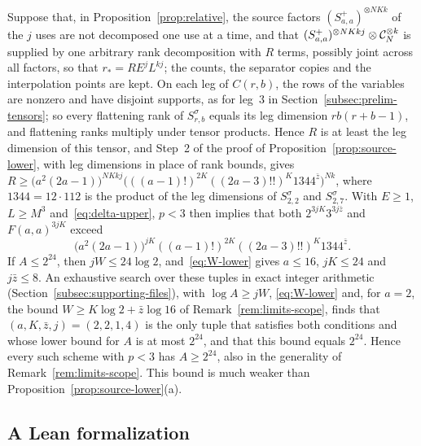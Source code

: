 \begin{remark}
\label{rem:joint-decompositions}
Suppose that, in Proposition~\ref{prop:relative}, the source factors
\((S^+_{a,a})^{\otimes NKk}\) of the \(j\) uses are not decomposed one
use at a time, and that
\((S^+_{a,a})^{\otimes NKkj}\otimes\mathcal C_N^{\otimes k}\) is supplied by
one arbitrary rank decomposition with \(R\) terms, possibly joint across
all factors, so that \(r_*=RE^jL^{kj}\); the counts, the separator
copies and the interpolation points are kept. On each leg of \(C(r,b)\), the rows of
the variables are nonzero and have disjoint supports, as for leg~\(3\)
in Section~\ref{subsec:prelim-tensors}; so every flattening rank of
\(S^\sigma_{r,b}\) equals its leg dimension \(rb(r+b-1)\), and
flattening ranks multiply under tensor products. Hence \(R\) is at least
the leg dimension of this tensor, and Step~2 of the proof of
Proposition~\ref{prop:source-lower}, with leg dimensions in place of
rank bounds, gives
\(R\ge\bigl(a^2(2a-1)\bigr)^{NKkj}
\bigl(((a-1)!)^{2K}((2a-3)!!)^K1344^{\bar z}\bigr)^{Nk}\), where
\(1344=12\cdot112\) is the product of the leg dimensions of
\(S^\sigma_{2,2}\) and \(S^\sigma_{2,7}\). With \(E\ge1\), \(L\ge M^3\)
and~\eqref{eq:delta-upper}, \(p<3\) then implies that both
\(2^{3jK}3^{3j\bar z}\) and \(F(a,a)^{3jK}\) exceed
\[
 \bigl(a^2(2a-1)\bigr)^{jK}((a-1)!)^{2K}((2a-3)!!)^K1344^{\bar z}.
\]
If \(A\le2^{24}\), then \(jW\le24\log2\), and~\eqref{eq:W-lower} gives
\(a\le16\), \(jK\le24\) and \(j\bar z\le8\). An exhaustive search over
these tuples in exact integer arithmetic
(Section~\ref{subsec:supporting-files}), with \(\log A\ge jW\),
\eqref{eq:W-lower} and, for \(a=2\), the bound
\(W\ge K\log2+\bar z\log16\) of Remark~\ref{rem:limits-scope}, finds
that \((a,K,\bar z,j)=(2,2,1,4)\) is the only tuple that satisfies both
conditions and whose lower bound for \(A\) is at most \(2^{24}\), and
that this bound equals \(2^{24}\). Hence every such scheme with \(p<3\) has
\(A\ge2^{24}\), also in the generality of
Remark~\ref{rem:limits-scope}. This bound is much weaker than
Proposition~\ref{prop:source-lower}(a).
\end{remark}

\subsection{A Lean formalization}
\label{subsec:lean}

